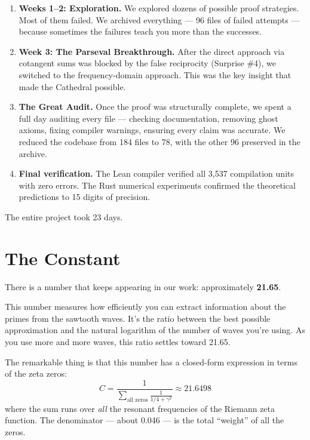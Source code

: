\documentclass[12pt,a4paper]{article}
\begin{document}
\begin{enumerate}
  \item \textbf{Weeks 1--2: Exploration.} We explored dozens of possible
    proof strategies. Most of them failed. We archived everything ---
    96 files of failed attempts --- because sometimes the failures
    teach you more than the successes.

  \item \textbf{Week 3: The Parseval Breakthrough.} After the direct
    approach via cotangent sums was blocked by the false reciprocity
    (Surprise \#4), we switched to the frequency-domain approach.
    This was the key insight that made the Cathedral possible.

  \item \textbf{The Great Audit.} Once the proof was structurally
    complete, we spent a full day auditing every file --- checking
    documentation, removing ghost axioms, fixing compiler warnings,
    ensuring every claim was accurate. We reduced the codebase from
    184 files to 78, with the other 96 preserved in the archive.

  \item \textbf{Final verification.} The Lean compiler verified all
    3,537 compilation units with zero errors. The Rust numerical
    experiments confirmed the theoretical predictions to 15 digits
    of precision.
\end{enumerate}

The entire project took 23 days.

\section*{The Constant}

There is a number that keeps appearing in our work: approximately
\textbf{21.65}.

This number measures how efficiently you can extract information about
the primes from the sawtooth waves. It's the ratio between the best
possible approximation and the natural logarithm of the number of
waves you're using. As you use more and more waves, this ratio
settles toward 21.65.

The remarkable thing is that this number has a closed-form expression
in terms of the zeta zeros:
\[
  C = \frac{1}{\displaystyle\sum_{\text{all zeros}} \frac{1}{1/4 + \gamma^2}}
  \approx 21.6498
\]
where the sum runs over \emph{all} the resonant frequencies of the Riemann
zeta function. The denominator --- about 0.046 --- is the total ``weight''
of all the zeros.
\end{document}
